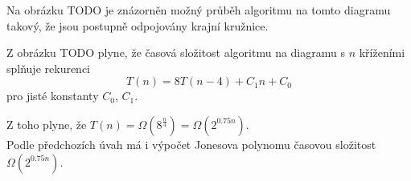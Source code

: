 \begin{dukaz}
Na obrázku TODO je znázorněn možný průběh algoritmu na tomto diagramu takový, že jsou postupně odpojovány krajní kružnice. 

Z obrázku TODO plyne, že časová složitost algoritmu na diagramu s $n$ kříženími splňuje rekurenci
$$ T(n) = 8T(n-4) + C_1 n + C_0  $$
pro jisté konstanty $C_0$, $C_1$.

Z toho plyne, že $T(n) = \Omega(8^{\frac{n}{4}})  =  \Omega(2^{0.75 n})$. \\

Podle předchozích úvah má i výpočet Jonesova polynomu časovou složitost $\Omega(2^{0.75n})$.
\end{dukaz}
